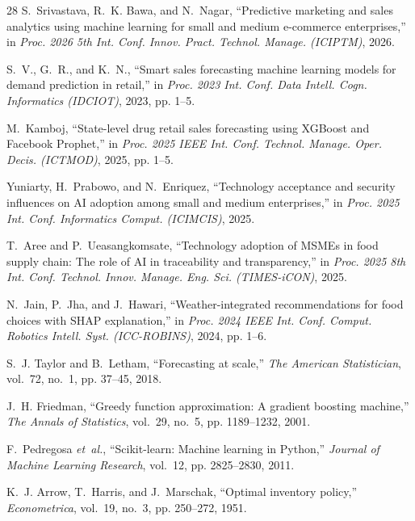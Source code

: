 \documentclass[conference]{IEEEtran}
\begin{document}
\begin{thebibliography}{28}
S.~Srivastava, R.~K. Bawa, and N.~Nagar, ``Predictive marketing and sales analytics using machine learning for small and medium e-commerce enterprises,'' in \emph{Proc. 2026 5th Int. Conf. Innov. Pract. Technol. Manage. (ICIPTM)}, 2026.

S.~V., G.~R., and K.~N., ``Smart sales forecasting machine learning models for demand prediction in retail,'' in \emph{Proc. 2023 Int. Conf. Data Intell. Cogn. Informatics (IDCIOT)}, 2023, pp. 1--5.

M.~Kamboj, ``State-level drug retail sales forecasting using XGBoost and Facebook Prophet,'' in \emph{Proc. 2025 IEEE Int. Conf. Technol. Manage. Oper. Decis. (ICTMOD)}, 2025, pp. 1--5.

Yuniarty, H.~Prabowo, and N.~Enriquez, ``Technology acceptance and security influences on AI adoption among small and medium enterprises,'' in \emph{Proc. 2025 Int. Conf. Informatics Comput. (ICIMCIS)}, 2025.

T.~Aree and P.~Ueasangkomsate, ``Technology adoption of MSMEs in food supply chain: The role of AI in traceability and transparency,'' in \emph{Proc. 2025 8th Int. Conf. Technol. Innov. Manage. Eng. Sci. (TIMES-iCON)}, 2025.

N.~Jain, P.~Jha, and J.~Hawari, ``Weather-integrated recommendations for food choices with SHAP explanation,'' in \emph{Proc. 2024 IEEE Int. Conf. Comput. Robotics Intell. Syst. (ICC-ROBINS)}, 2024, pp. 1--6.

S.~J. Taylor and B.~Letham, ``Forecasting at scale,'' \emph{The American Statistician}, vol.~72, no.~1, pp. 37--45, 2018.

J.~H. Friedman, ``Greedy function approximation: A gradient boosting machine,'' \emph{The Annals of Statistics}, vol.~29, no.~5, pp. 1189--1232, 2001.

F.~Pedregosa \emph{et~al.}, ``Scikit-learn: Machine learning in Python,'' \emph{Journal of Machine Learning Research}, vol.~12, pp. 2825--2830, 2011.

K.~J. Arrow, T.~Harris, and J.~Marschak, ``Optimal inventory policy,'' \emph{Econometrica}, vol.~19, no.~3, pp. 250--272, 1951.

\end{thebibliography}
\end{document}
